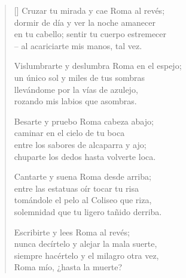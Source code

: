 \documentclass[a4paper,11pt]{article}
\begin{document}
\thispagestyle{empty}


\settowidth{\versewidth}{en tu cabello; sentir tu cuerpo estremecer}

\bigskip

\begin{verse}[\versewidth]
  Cruzar tu mirada y cae Roma al revés; \\
  dormir de día y ver la noche amanecer \\
  en tu cabello; sentir tu cuerpo estremecer \\
  -- al acariciarte mis manos, tal vez.

  Vislumbrarte y deslumbra Roma en el espejo; \\
  un único sol y miles de tus sombras \\
  llevándome por la vías de azulejo, \\
  rozando mis labios que asombras.

  Besarte y pruebo Roma cabeza abajo; \\
  caminar en el cielo de tu boca \\
  entre los sabores de alcaparra y ajo; \\
  chuparte los dedos hasta volverte loca.

  Cantarte y suena Roma desde arriba; \\
  entre las estatuas oír tocar tu risa \\
  tomándole el pelo al Coliseo que riza, \\
  solemnidad que tu ligero tañido derriba.

  Escribirte y lees Roma al revés; \\
  nunca decírtelo y alejar la mala suerte, \\
  siempre hacértelo y el milagro otra vez, \\
  Roma mío, ¿hasta la muerte?
\end{verse}
\end{document}
